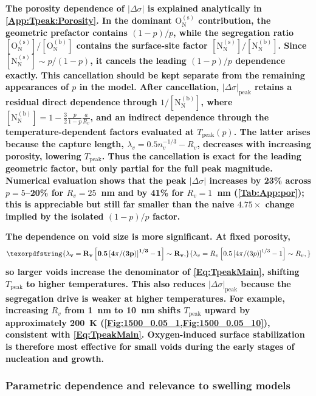 \documentclass[preprint,12pt,sort&compress]{elsarticle}
\newcommand{\?}{\stackrel{?}{=}}
\providecommand{\DIFaddtex}[1]{{\bf #1}} %
\providecommand{\DIFadd}[1]{\texorpdfstring{\DIFaddtex{#1}}{#1}} %
\begin{document}
\DIFadd{The porosity dependence of $|\Delta\sigma|$ is explained analytically in \ref{App:Tpeak:Porosity}. In the dominant $\text{O}_\text{N}^{(\text{s})}$ contribution, the geometric prefactor contains $(1-p)/p$, while the segregation ratio $[\text{O}_\text{N}^{(\text{s})}]/[\text{O}_\text{N}^{(\text{b})}]$ contains the surface-site factor $[\text{N}_\text{N}^{(\text{s})}]/[\text{N}_\text{N}^{(\text{b})}]$. Since $[\text{N}_\text{N}^{(\text{s})}] \sim p/(1-p)$, it cancels the leading $(1-p)/p$ dependence exactly. This cancellation should be kept separate from the remaining appearances of $p$ in the model. After cancellation, $|\Delta \sigma|_\text{peak}$ retains a residual direct dependence through $1/[\text{N}_\text{N}^{(\text{b})}]$, where $[\text{N}_\text{N}^{(\text{b})}]=1-\frac{3}{2}\frac{p}{1-p}\frac{a}{R_v}$, and an indirect dependence through the temperature-dependent factors evaluated at $T_\text{peak}(p)$. The latter arises because the capture length, $\lambda_v=0.5n_v^{-1/3}-R_v$, decreases with increasing porosity, lowering $T_\text{peak}$. Thus the cancellation is exact for the leading geometric factor, but only partial for the full peak magnitude. Numerical evaluation shows that the peak $|\Delta\sigma|$ increases by 23\% across $p=5$--20\% for $R_v=25$~nm and by 41\% for $R_v=1$~nm (\cref{Tab:App:por}); this is appreciable but still far smaller than the naive $4.75\times$ change implied by the isolated $(1-p)/p$ factor.
}

\DIFadd{The dependence on void size is more significant. At fixed porosity,
}\begin{equation}
\DIFadd{\lambda_v = R_v \left[ 0.5 \left[ 4\pi/(3p) \right]^{1/3} - 1 \right] \sim R_v,
}\end{equation}
\DIFadd{so larger voids increase the denominator of \cref{Eq:TpeakMain}, shifting $T_\text{peak}$ to higher temperatures. This also reduces $|\Delta\sigma|_\text{peak}$ because the segregation drive is weaker at higher temperatures. For example, increasing $R_v$ from 1~nm to 10~nm shifts $T_\text{peak}$ upward by approximately 200~K (\cref{Fig:1500_0.05_1,Fig:1500_0.05_10}), consistent with \cref{Eq:TpeakMain}. Oxygen-induced surface stabilization is therefore most effective for small voids during the early stages of nucleation and growth.
}

\subsubsection{\DIFadd{Parametric dependence and relevance to swelling models}}
\end{document}

